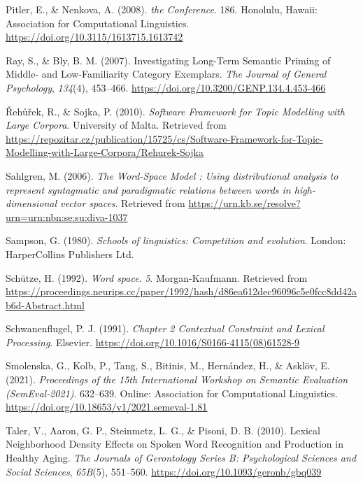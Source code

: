 \documentclass[
  english,
  man,floatsintext]{apa6}
\newlength{\cslhangindent}
\newenvironment{CSLReferences}[2] %
 {\begin{list}{}{%
  \setlength{\itemindent}{0pt}
  \setlength{\leftmargin}{0pt}
  \setlength{\parsep}{0pt}
  \ifodd #1
   \setlength{\leftmargin}{\cslhangindent}
   \setlength{\itemindent}{-1\cslhangindent}
  \fi
  \setlength{\itemsep}{#2\baselineskip}}}
 {\end{list}}
\begin{document}
\begin{CSLReferences}{1}{0}
Pitler, E., \& Nenkova, A. (2008). \emph{the Conference}. 186. Honolulu, Hawaii: Association for Computational Linguistics. \url{https://doi.org/10.3115/1613715.1613742}

Ray, S., \& Bly, B. M. (2007). Investigating Long-Term Semantic Priming of Middle- and Low-Familiarity Category Exemplars. \emph{The Journal of General Psychology}, \emph{134}(4), 453--466. \url{https://doi.org/10.3200/GENP.134.4.453-466}

Řehůřek, R., \& Sojka, P. (2010). \emph{Software Framework for Topic Modelling with Large Corpora}. University of Malta. Retrieved from \url{https://repozitar.cz/publication/15725/cs/Software-Framework-for-Topic-Modelling-with-Large-Corpora/Rehurek-Sojka}

Sahlgren, M. (2006). \emph{The Word-Space Model : Using distributional analysis to represent syntagmatic and paradigmatic relations between words in high-dimensional vector spaces}. Retrieved from \url{https://urn.kb.se/resolve?urn=urn:nbn:se:su:diva-1037}

Sampson, G. (1980). \emph{Schools of linguistics: Competition and evolution}. London: HarperCollins Publishers Ltd.

Schütze, H. (1992). \emph{Word space}. \emph{5}. Morgan-Kaufmann. Retrieved from \url{https://proceedings.neurips.cc/paper/1992/hash/d86ea612dec96096c5e0fcc8dd42ab6d-Abstract.html}

Schwanenflugel, P. J. (1991). \emph{Chapter 2 Contextual Constraint and Lexical Processing}. Elsevier. \url{https://doi.org/10.1016/S0166-4115(08)61528-9}

Smolenska, G., Kolb, P., Tang, S., Bitinis, M., Hernández, H., \& Asklöv, E. (2021). \emph{Proceedings of the 15th International Workshop on Semantic Evaluation (SemEval-2021)}. 632--639. Online: Association for Computational Linguistics. \url{https://doi.org/10.18653/v1/2021.semeval-1.81}

Taler, V., Aaron, G. P., Steinmetz, L. G., \& Pisoni, D. B. (2010). Lexical Neighborhood Density Effects on Spoken Word Recognition and Production in Healthy Aging. \emph{The Journals of Gerontology Series B: Psychological Sciences and Social Sciences}, \emph{65B}(5), 551--560. \url{https://doi.org/10.1093/geronb/gbq039}


\end{CSLReferences}
\end{document}
